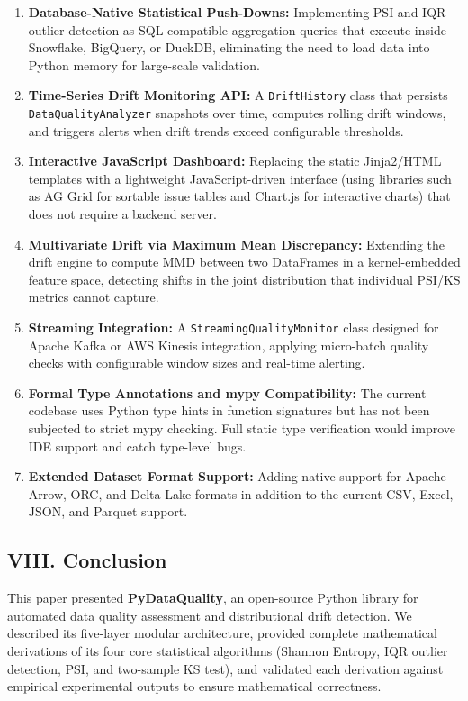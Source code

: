 \documentclass{article}
\begin{document}
\begin{enumerate}
\def\labelenumi{\arabic{enumi}.}
\item
  \textbf{Database-Native Statistical Push-Downs:} Implementing PSI and
  IQR outlier detection as SQL-compatible aggregation queries that
  execute inside Snowflake, BigQuery, or DuckDB, eliminating the need to
  load data into Python memory for large-scale validation.
\item
  \textbf{Time-Series Drift Monitoring API:} A \texttt{DriftHistory}
  class that persists \texttt{DataQualityAnalyzer} snapshots over time,
  computes rolling drift windows, and triggers alerts when drift trends
  exceed configurable thresholds.
\item
  \textbf{Interactive JavaScript Dashboard:} Replacing the static
  Jinja2/HTML templates with a lightweight JavaScript-driven interface
  (using libraries such as AG Grid for sortable issue tables and
  Chart.js for interactive charts) that does not require a backend
  server.
\item
  \textbf{Multivariate Drift via Maximum Mean Discrepancy:} Extending
  the drift engine to compute MMD between two DataFrames in a
  kernel-embedded feature space, detecting shifts in the joint
  distribution that individual PSI/KS metrics cannot capture.
\item
  \textbf{Streaming Integration:} A \texttt{StreamingQualityMonitor}
  class designed for Apache Kafka or AWS Kinesis integration, applying
  micro-batch quality checks with configurable window sizes and
  real-time alerting.
\item
  \textbf{Formal Type Annotations and mypy Compatibility:} The current
  codebase uses Python type hints in function signatures but has not
  been subjected to strict mypy checking. Full static type verification
  would improve IDE support and catch type-level bugs.
\item
  \textbf{Extended Dataset Format Support:} Adding native support for
  Apache Arrow, ORC, and Delta Lake formats in addition to the current
  CSV, Excel, JSON, and Parquet support.
\end{enumerate}

\subsection{VIII. Conclusion}\label{viii.-conclusion}

This paper presented \textbf{PyDataQuality}, an open-source Python
library for automated data quality assessment and distributional drift
detection. We described its five-layer modular architecture, provided
complete mathematical derivations of its four core statistical
algorithms (Shannon Entropy, IQR outlier detection, PSI, and two-sample
KS test), and validated each derivation against empirical experimental
outputs to ensure mathematical correctness.
\end{document}
